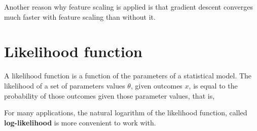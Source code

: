 Another reason why feature scaling is applied is that gradient descent converges much faster with feature scaling than without it.

\section{Likelihood function}
A likelihood function is a function of the parameters of a statistical model. The likelihood
of a set of parameters values $\theta$, given outcomes $x$, is equal to the probability of those
outcomes given those parameter values, that is,

For many applications, the natural logarithm of the likelihood function, called 
\textbf{log-likelihood} is more convenient to work with.

